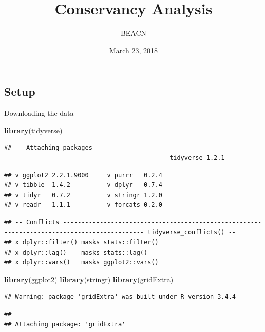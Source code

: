 \documentclass[]{article}
\title{Conservancy Analysis}
\author{BEACN}
\date{March 23, 2018}
\newenvironment{Shaded}{\begin{snugshade}}{\end{snugshade}}
\newcommand{\KeywordTok}[1]{\textcolor[rgb]{0.13,0.29,0.53}{\textbf{#1}}}
\newcommand{\NormalTok}[1]{#1}
\begin{document}
\maketitle

\subsection{Setup}\label{setup}

Downloading the data

\begin{Shaded}
\begin{Highlighting}[]
\KeywordTok{library}\NormalTok{(tidyverse)}
\end{Highlighting}
\end{Shaded}

\begin{verbatim}
## -- Attaching packages ----------------------------------------------------------------------------------------- tidyverse 1.2.1 --
\end{verbatim}

\begin{verbatim}
## v ggplot2 2.2.1.9000     v purrr   0.2.4     
## v tibble  1.4.2          v dplyr   0.7.4     
## v tidyr   0.7.2          v stringr 1.2.0     
## v readr   1.1.1          v forcats 0.2.0
\end{verbatim}

\begin{verbatim}
## -- Conflicts -------------------------------------------------------------------------------------------- tidyverse_conflicts() --
## x dplyr::filter() masks stats::filter()
## x dplyr::lag()    masks stats::lag()
## x dplyr::vars()   masks ggplot2::vars()
\end{verbatim}

\begin{Shaded}
\begin{Highlighting}[]
\KeywordTok{library}\NormalTok{(ggplot2)}
\KeywordTok{library}\NormalTok{(stringr)}
\KeywordTok{library}\NormalTok{(gridExtra)}
\end{Highlighting}
\end{Shaded}

\begin{verbatim}
## Warning: package 'gridExtra' was built under R version 3.4.4
\end{verbatim}

\begin{verbatim}
## 
## Attaching package: 'gridExtra'
\end{verbatim}
\end{document}
